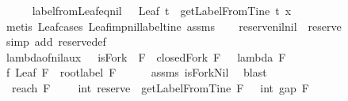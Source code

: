 \begin{isabellebody}
\isamarkupfalse%
%
\endisatagproof
{\isafoldproof}%
%
\isadelimproof
\isanewline
%
\endisadelimproof
\ \ \ \ \isanewline
{}\isamarkupfalse%
\ label{\isacharunderscore}from{\isacharunderscore}Leaf{\isacharunderscore}eq{\isacharunderscore}nil\ {\isacharcolon}\ \ {\isachardoublequoteopen}Leaf\ t{\isachardoublequoteclose}\ \ {\isachardoublequoteopen}getLabelFromTine\ t\ x\ {\isacharequal}\ {\isacharbrackleft}{\isacharbrackright}{\isachardoublequoteclose}\isanewline
%
\isadelimproof
\ \ %
\endisadelimproof
%
\isatagproof
{}\isamarkupfalse%
\ {\isacharparenleft}metis\ Leaf{\isachardot}cases\ Leaf{\isacharunderscore}imp{\isacharunderscore}nil{\isacharunderscore}label{\isacharunderscore}tine\ assms{\isacharparenright}%
\endisatagproof
{\isafoldproof}%
%
\isadelimproof
\isanewline
%
\endisadelimproof
\ \ \isanewline
{}\isamarkupfalse%
\ reserve{\isacharunderscore}nil{\isacharunderscore}nil\ {\isacharcolon}\ {\isachardoublequoteopen}reserve\ {\isacharbrackleft}{\isacharbrackright}\ {\isacharbrackleft}{\isacharbrackright}\ {\isacharequal}\ {}{\isachardoublequoteclose}\ \isanewline
%
\isadelimproof
\ \ %
\endisadelimproof
%
\isatagproof
{}\isamarkupfalse%
\ {\isacharparenleft}simp\ add{\isacharcolon}\ reserve{\isacharunderscore}def{\isacharparenright}%
\endisatagproof
{\isafoldproof}%
%
\isadelimproof
\isanewline
%
\endisadelimproof
\isanewline
{}\isamarkupfalse%
\ lambda{\isacharunderscore}of{\isacharunderscore}nil{\isacharunderscore}aux\ {\isacharcolon}\ \ {\isachardoublequoteopen}isFork\ {\isacharbrackleft}{\isacharbrackright}\ F\ {\isasymand}\ closedFork\ F\ {\isacharbrackleft}{\isacharbrackright}{\isachardoublequoteclose}\ \ {\isachardoublequoteopen}lambda\ F\ {\isacharbrackleft}{\isacharbrackright}\ {\isacharequal}\ {}{\isachardoublequoteclose}\ \ \ \isanewline
%
\isadelimproof
%
\endisadelimproof
%
\isatagproof
{}\isamarkupfalse%
\ {\isacharminus}\isanewline
\ \ \isamarkupfalse%
\ f{}{\isacharcolon}\ {\isachardoublequoteopen}Leaf\ F\ {\isasymand}\ root{\isacharunderscore}label{\isacharunderscore}{}\ F{\isachardoublequoteclose}\isanewline
\ \ \ \ \isamarkupfalse%
\ assms\ isFork{\isacharunderscore}Nil\ \isamarkupfalse%
\ blast\ \isanewline
\ \ \isamarkupfalse%
\ \isamarkupfalse%
\ {\isachardoublequoteopen}\ reach\ F\ {\isacharbrackleft}{\isacharbrackright}\ {\isacharbrackleft}{\isacharbrackright}\ {\isacharequal}\ \ int\ {\isacharparenleft}reserve\ {\isacharbrackleft}{\isacharbrackright}\ {\isacharparenleft}getLabelFromTine\ F\ {\isacharbrackleft}{\isacharbrackright}{\isacharparenright}{\isacharparenright}\ {\isacharminus}\ int\ {\isacharparenleft}gap\ F\ {\isacharbrackleft}{\isacharbrackright}{\isacharparenright}{\isachardoublequoteclose}\isanewline

\end{isabellebody}
